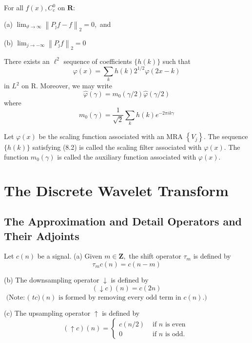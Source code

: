 For all $f(x), C_{c}^{0}$ on $\mathbf{R}:$

(a) $\lim _{\vartheta \rightarrow \infty}\left\|P_{\jmath} f-f\right\|_{2}=0,$ and

(b) $\lim _{j \rightarrow-\infty}\left\|P_{\jmath} f\right\|_{2}=0$

There exists an $\ell^{2}$ sequence of coefficients $\{h(k)\}$ such that
$$
\varphi(x)=\sum_{k} h(k) 2^{1 / 2} \varphi(2 x-k)
$$
in $L^{2}$ on R. Moreover, we may write
$$
\hat{\varphi}(\gamma)=m_{0}(\gamma / 2) \widehat{\varphi}(\gamma / 2)
$$
where
$$
m_{0}(\gamma)=\frac{1}{\sqrt{2}} \sum_{k} h(k) e^{-2 \pi i k \gamma}
$$

\begin{definition}

Let $\varphi(x)$ be the scaling function associated with an MRA $\left\{V_{j}\right\} .$ The sequence $\{h(k)\}$ satisfying (8.2) is called the scaling filter associated
with $\varphi(x) .$ The function $m_{0}(\gamma)$ is called the auxiliary function associated with $\varphi(x) .$
\end{definition}


\section{The Discrete Wavelet Transform}

\subsection{The Approximation and Detail Operators and Their
Adjoints}

\begin{definition}

Let $c(n)$ be a signal.
(a) Given $m \in \mathbf{Z},$ the shift operator $\tau_{m}$ is defined by
$$
\tau_{m} c(n)=c(n-m)
$$

(b) The downsampling operator $\downarrow$ is defined by
$$
(\downarrow c)(n)=c(2 n)
$$
$\text { (Note: ( }t c)(n) \text { is formed by removing every odd term in } c(n) .)$

(c) The upsampling operator $\uparrow$ is defined by
$$
(\uparrow c)(n)=\left\{\begin{array}{cc}{c(n / 2)} & {\text { if } n \text { is even }} \\ {0} & {\text { if } n \text { is odd. }}\end{array}\right.
$$

\end{definition}

